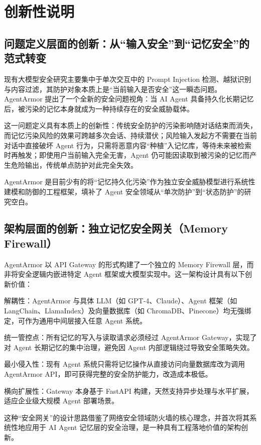 \documentclass[UTF8,zihao=-4,oneside,fontset=none]{ctexrep}
\begin{document}
\chapter{创新性说明}
	
	\section{问题定义层面的创新：从“输入安全”到“记忆安全”的范式转变}
	现有大模型安全研究主要集中于单次交互中的 Prompt Injection 检测、越狱识别与内容过滤，其防护对象本质上是“当前输入是否安全”这一瞬态问题。AgentArmor 提出了一个全新的安全问题视角：当 AI Agent 具备持久化长期记忆后，被污染的记忆本身就成为一种持续存在的安全威胁载体。
	
	这一问题定义具有本质上的创新性：传统安全防护的污染影响随对话结束而消失，而记忆污染风险的效果可跨越多次会话、持续潜伏；风险输入发起方不需要在当前对话中直接破坏 Agent 行为，只需将恶意内容“种植”入记忆库，等待未来被检索时再触发；即使用户当前输入完全无害，Agent 仍可能因读取到被污染的记忆而产生危险输出，传统单点防护对此完全失效。
	
	AgentArmor 是目前少有的将“记忆持久化污染”作为独立安全威胁模型进行系统性建模和防御的工程框架，填补了 Agent 安全领域从“单次防护”到“状态防护”的研究空白。
	
	\section{架构层面的创新：独立记忆安全网关（Memory Firewall）}
	AgentArmor 以 API Gateway 的形式构建了一个独立的 Memory Firewall 层，而非将安全逻辑内嵌进特定 Agent 框架或大模型实现中。这一架构设计具有以下创新价值：
	
	解耦性：AgentArmor 与具体 LLM（如 GPT-4、Claude）、Agent 框架（如 LangChain、LlamaIndex）及向量数据库（如 ChromaDB、Pinecone）均无强绑定，可作为通用中间层接入任意 Agent 系统。
	
	统一管控点：所有记忆的写入与读取请求必须经过 AgentArmor Gateway，实现了对 Agent 长期记忆的集中治理，避免因 Agent 内部逻辑绕过导致安全策略失效。
	
	最小侵入性：现有 Agent 系统只需将记忆操作从直接访问向量数据库改为调用 AgentArmor API，即可获得完整的安全防护能力，改造成本极低。
	
	横向扩展性：Gateway 本身基于 FastAPI 构建，天然支持异步处理与水平扩展，适应企业级大规模 Agent 部署场景。
	
	这种“安全网关”的设计思路借鉴了网络安全领域防火墙的核心理念，并首次将其系统性地应用于 AI Agent 记忆层的安全治理，是一种具有工程落地价值的架构创新。
	
\end{document}
